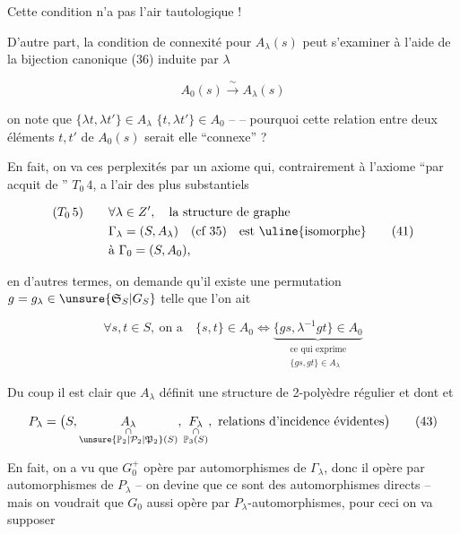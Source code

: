 Cette condition n'a pas l'air tautologique !

D'autre part, la condition de connexité pour $A_\lambda(s)$ peut s'examiner à l'aide de la bijection canonique (36) induite par $\lambda$

\[
A_0(s)\xrightarrow{\ \sim\ } A_\lambda(s)
\]

on note que $\{\lambda t,\lambda t'\}\in A_\lambda$  $\{t,\lambda t'\}\in A_0$ -- -- pourquoi cette relation  entre deux éléments $t,t'$ de $A_0(s)$ serait elle ``connexe'' ?


En fait, on va  ces perplexités par un axiome qui, contrairement à l'axiome ``par acquit de '' $T_0\,4$, a l'air des plus substantiels

\[
\begin{aligned}
(T_0\,5)\qquad &\forall\lambda\in Z',\quad\text{la structure de graphe}\\
&\Gamma_\lambda=(S,A_\lambda)\quad(\text{cf }35)\quad\text{est \uline{isomorphe}}\\
&\text{à }\Gamma_0=(S,A_0),
\end{aligned}\tag*{$(41)$}
\]

en d'autres termes, on demande qu'il existe une permutation $g=g_\lambda\in\unsure{\mathfrak S_S|G_S}$ telle que l'on ait

\[
\forall s,t\in S,\ \text{on a}\quad \{s,t\}\in A_0\Longleftrightarrow
 \underbrace{\{gs,\lambda^{-1}gt\}\in A_0}_{\substack{\text{ce qui exprime}\\\{gs,gt\}\in A_\lambda}}
\tag*{$(42)$}
\]

Du coup il est clair que $A_\lambda$ définit une structure de 2-polyèdre régulier et dont et 

\[
P_\lambda=\bigl(S,\underset{\substack{\cap\\\unsure{\mathbb P_2|\mathcal P_2|\mathfrak P_2}(S)}}{A_\lambda},
 \underset{\substack{\cap\\\mathbb P_3(S)}}{F_\lambda},\ \text{relations d'incidence évidentes}\bigr)
\tag*{$(43)$}
\]

En fait, on a vu que $G_0^+$ opère par automorphismes de $\Gamma_\lambda$, donc il opère par automorphismes de $P_\lambda$ -- on devine que ce sont des automorphismes directs --  mais on voudrait que $G_0$ aussi opère  par $P_\lambda$-automorphismes, pour ceci on va supposer

